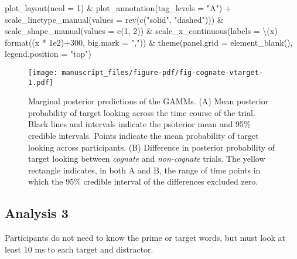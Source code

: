 \documentclass[
  letterpaper,
  DIV=11,
  numbers=noendperiod]{scrartcl}
\newenvironment{Shaded}{\begin{snugshade}}{\end{snugshade}}
\newcommand{\AttributeTok}[1]{\textcolor[rgb]{0.40,0.45,0.13}{#1}}
\newcommand{\DecValTok}[1]{\textcolor[rgb]{0.68,0.00,0.00}{#1}}
\newcommand{\FloatTok}[1]{\textcolor[rgb]{0.68,0.00,0.00}{#1}}
\newcommand{\FunctionTok}[1]{\textcolor[rgb]{0.28,0.35,0.67}{#1}}
\newcommand{\NormalTok}[1]{\textcolor[rgb]{0.00,0.23,0.31}{#1}}
\newcommand{\SpecialCharTok}[1]{\textcolor[rgb]{0.37,0.37,0.37}{#1}}
\newcommand{\StringTok}[1]{\textcolor[rgb]{0.13,0.47,0.30}{#1}}
\begin{document}
\begin{Shaded}
\begin{Highlighting}[]
    \FunctionTok{plot\_layout}\NormalTok{(}\AttributeTok{ncol =} \DecValTok{1}\NormalTok{) }\SpecialCharTok{\&}
    \FunctionTok{plot\_annotation}\NormalTok{(}\AttributeTok{tag\_levels =} \StringTok{"A"}\NormalTok{) }\SpecialCharTok{+}
    \FunctionTok{scale\_linetype\_manual}\NormalTok{(}\AttributeTok{values =} \FunctionTok{rev}\NormalTok{(}\FunctionTok{c}\NormalTok{(}\StringTok{"solid"}\NormalTok{, }\StringTok{"dashed"}\NormalTok{))) }\SpecialCharTok{\&}
    \FunctionTok{scale\_shape\_manual}\NormalTok{(}\AttributeTok{values =} \FunctionTok{c}\NormalTok{(}\DecValTok{1}\NormalTok{, }\DecValTok{2}\NormalTok{)) }\SpecialCharTok{\&}
    \FunctionTok{scale\_x\_continuous}\NormalTok{(}\AttributeTok{labels =}\NormalTok{ \textbackslash{}(x) }\FunctionTok{format}\NormalTok{((x }\SpecialCharTok{*} \FloatTok{1e2}\NormalTok{)}\SpecialCharTok{+}\DecValTok{300}\NormalTok{, }
                                            \AttributeTok{big.mark =} \StringTok{","}\NormalTok{)) }\SpecialCharTok{\&}
    \FunctionTok{theme}\NormalTok{(}\AttributeTok{panel.grid =} \FunctionTok{element\_blank}\NormalTok{(),}
          \AttributeTok{legend.position =} \StringTok{"top"}\NormalTok{) }
\end{Highlighting}
\end{Shaded}

\begin{figure}[H]

{\centering \texttt{[image: manuscript\_files/figure-pdf/fig-cognate-vtarget-1.pdf]}

}

\caption{\label{fig-cognate-vtarget}Marginal posterior predictions of
the GAMMs. (A) Mean posterior probability of target looking across the
time course of the trial. Black lines and intervals indicate the
psoterior mean and 95\% credible intervals. Points indicate the mean
probability of target looking across participants. (B) Difference in
posterior probability of target looking between \emph{cognate} and
\emph{non-cognate} trials. The yellow rectangle indicates, in both A and
B, the range of time points in which the 95\% credible interval of the
differences excluded zero.}

\end{figure}

\hypertarget{analysis-3}{%
\subsection{Analysis 3}\label{analysis-3}}

Participants do not need to know the prime or target words, but must
look at least 10 ms to each target and distractor.
\end{document}
